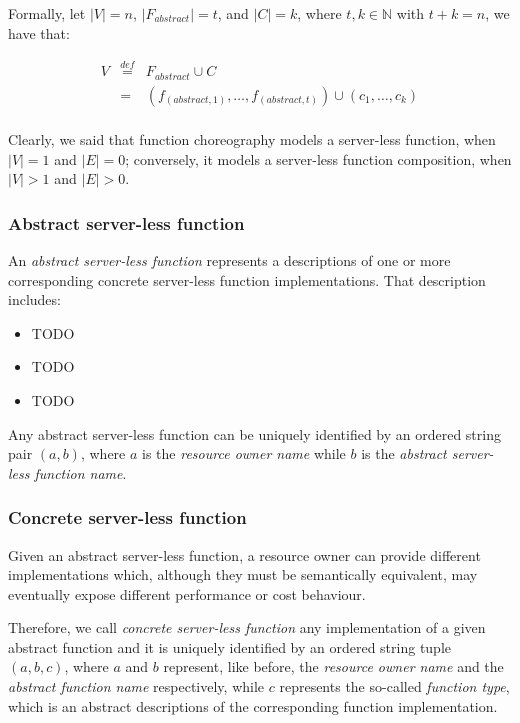 \documentclass[10pt,a4paper]{article}
\newcommand{\mathDef}{\overset{\textit{def}}{=}}
\begin{document}
Formally, let $|V| = n$, $|F_{abstract}| = t$, and $|C| = k$, where $t,k \in \mathbb{N}$ with $t + k = n$, we have that:

\begin{equation}
\begin{array}{lll}

V & \mathDef & F_{abstract} \cup C \\
  & = & (f_{(abstract, 1)}, \ldots, f_{(abstract, t)}) \cup (c_1, \ldots, c_k) \\
\end{array}
\end{equation}

Clearly, we said that function choreography models a server-less function, when $|V| = 1$ and $|E| = 0$; conversely, it models a server-less function composition, when $|V| > 1$ and $|E| > 0$.

\subsubsection{Abstract server-less function}

An \textit{abstract server-less function} represents a descriptions of one or more corresponding concrete server-less function implementations. That description includes:

\begin{itemize}

\item TODO
\item TODO
\item TODO

\end{itemize}

Any abstract server-less function can be uniquely identified by an ordered string pair $(a, b)$, where $a$ is the \textit{resource owner name} while $b$ is the \textit{abstract server-less function name}.

\subsubsection{Concrete server-less function}

Given an abstract server-less function, a resource owner can provide different implementations which, although they must be semantically equivalent, may eventually expose different performance or cost behaviour.

Therefore, we call \textit{concrete server-less function} any implementation of a given abstract function and it is uniquely identified by an ordered string tuple $(a, b, c)$, where $a$ and $b$ represent, like before, the \textit{resource owner name} and the \textit{abstract function name} respectively, while $c$ represents the so-called \textit{function type}, which is an abstract descriptions of the corresponding function implementation.
\end{document}
